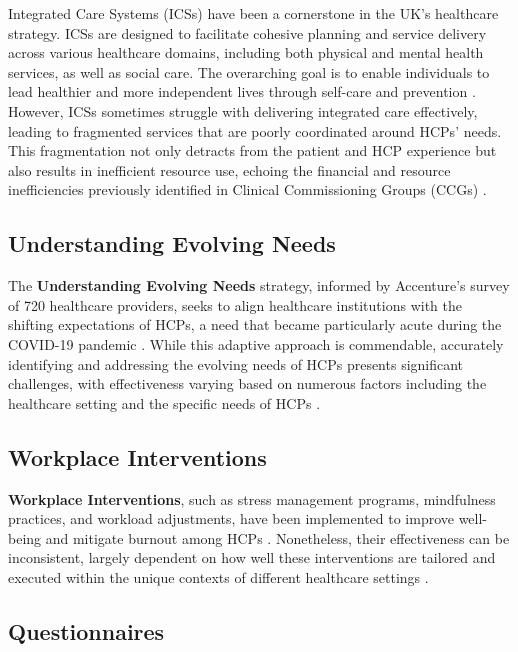 Integrated Care Systems (ICSs) have been a cornerstone in the UK's healthcare strategy. ICSs are designed to facilitate cohesive planning and service delivery across various healthcare domains, including both physical and mental health services, as well as social care. The overarching goal is to enable individuals to lead healthier and more independent lives through self-care and prevention \cite{ref9}. However, ICSs sometimes struggle with delivering integrated care effectively, leading to fragmented services that are poorly coordinated around HCPs' needs. This fragmentation not only detracts from the patient and HCP experience but also results in inefficient resource use, echoing the financial and resource inefficiencies previously identified in Clinical Commissioning Groups (CCGs) \cite{ref11,ref12}.

\subsection{Understanding Evolving Needs}

The \textbf{Understanding Evolving Needs} strategy, informed by Accenture's survey of 720 healthcare providers, seeks to align healthcare institutions with the shifting expectations of HCPs, a need that became particularly acute during the COVID-19 pandemic \cite{ref18}. While this adaptive approach is commendable, accurately identifying and addressing the evolving needs of HCPs presents significant challenges, with effectiveness varying based on numerous factors including the healthcare setting and the specific needs of HCPs \cite{ref13,ref14}.

\subsection{Workplace Interventions}

\textbf{Workplace Interventions}, such as stress management programs, mindfulness practices, and workload adjustments, have been implemented to improve well-being and mitigate burnout among HCPs \cite{ref10}. Nonetheless, their effectiveness can be inconsistent, largely dependent on how well these interventions are tailored and executed within the unique contexts of different healthcare settings \cite{ref15}.

\subsection{Questionnaires}

